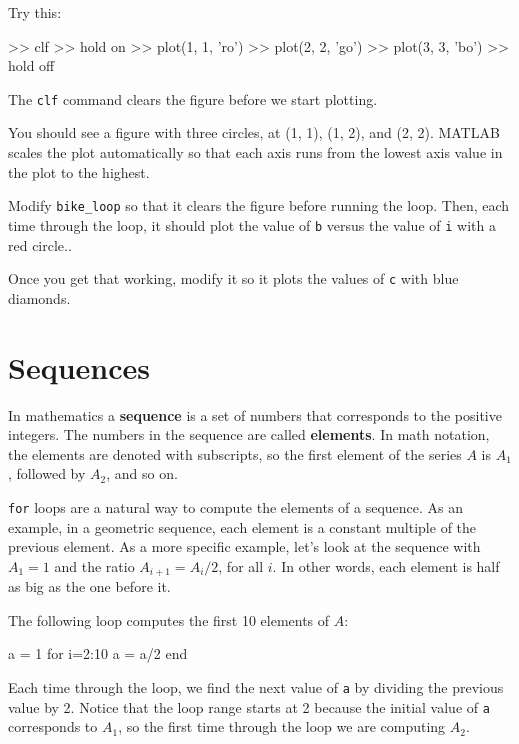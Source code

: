 \documentclass[
]{book}
\numberwithin{Answer}{chapter}
\numberwithin{Exercise}{chapter}
\begin{document}

Try this:

\begin{code}
>> clf
>> hold on
>> plot(1, 1, 'ro')
>> plot(2, 2, 'go')
>> plot(3, 3, 'bo')
>> hold off
\end{code}

The {\tt clf} command clears the figure before we start plotting.


You should see a figure with three circles, at (1, 1), (1, 2), and (2, 2).  MATLAB scales the plot automatically so that each axis runs from the lowest axis value in the plot to the highest.

\begin{ex}
Modify \verb"bike_loop" so that it clears the figure before running the loop.  Then, each time through the
loop, it should plot the value of {\tt b} versus the value of {\tt i} with a red circle..

Once you get that working, modify it so it plots the values of {\tt c} with blue diamonds.
\end{ex}


\section{Sequences}

In mathematics a {\bf sequence} is a set of numbers that corresponds
to the positive integers.  The numbers in the sequence are
called {\bf elements}.  In math notation, the elements
are denoted with subscripts, so the first element of the series $A$ is
$A_1$, followed by $A_2$, and so on.


{\tt for} loops are a natural way to compute the elements of a sequence.
As an example, in a geometric sequence, each element is a constant
multiple of the previous element.  As a more specific example, let's
look at the sequence with $A_1 = 1$ and the ratio $A_{i+1} = A_i/2$,
for all $i$.  In other words, each element is half as big as the one
before it.

The following loop computes the first 10 elements of $A$:

\begin{code}
a = 1
for i=2:10
    a = a/2
end
\end{code}

Each time through the loop, we find the next value of {\tt a}
by dividing the previous value by 2.  Notice that the loop
range starts at 2 because the initial value of {\tt a} corresponds
to $A_1$, so the first time through the loop we are computing
$A_2$.
\end{document}
